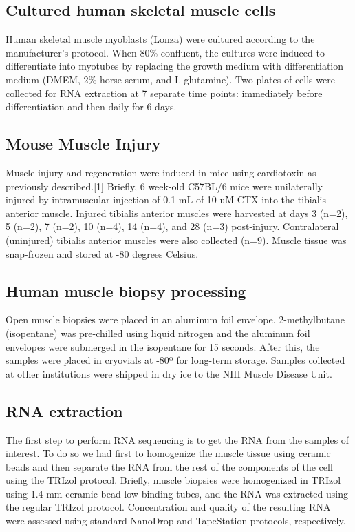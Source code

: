 \subsection{Cultured human skeletal muscle cells}
Human skeletal muscle myoblasts (Lonza) were cultured according to the manufacturer’s protocol. When 80\% confluent, the cultures were induced to differentiate into myotubes by replacing the growth medium with differentiation medium (DMEM, 2\% horse serum, and L-glutamine).  Two plates of cells were collected for RNA extraction at 7 separate time points: immediately before differentiation and then daily for 6 days.

\subsection{Mouse Muscle Injury}
Muscle injury and regeneration were induced in mice using cardiotoxin as previously described.[1] Briefly, 6 week-old C57BL/6 mice were unilaterally injured by intramuscular injection of 0.1 mL of 10 uM CTX into the tibialis anterior muscle. Injured tibialis anterior muscles were harvested at days 3 (n=2), 5 (n=2), 7 (n=2), 10 (n=4), 14 (n=4), and 28 (n=3) post-injury. Contralateral (uninjured) tibialis anterior muscles were also collected (n=9). Muscle tissue was snap-frozen and stored at -80 degrees Celsius.

\subsection{Human muscle biopsy processing}
Open muscle biopsies were placed in an aluminum foil envelope. 2-methylbutane (isopentane) was pre-chilled using liquid nitrogen and the aluminum foil envelopes were submerged in the isopentane for 15 seconds. After this, the samples were placed in cryovials at -80º for long-term storage. Samples collected at other institutions were shipped in dry ice to the NIH Muscle Disease Unit.

\subsection{RNA extraction}
The first step to perform RNA sequencing is to get the RNA from the samples of interest. To do so we had first to homogenize the muscle tissue using ceramic beads and then separate the RNA from the rest of the components of the cell using the TRIzol protocol. Briefly, muscle biopsies were homogenized in TRIzol using 1.4 mm ceramic bead low-binding tubes, and the RNA was extracted using the regular TRIzol protocol. Concentration and quality of the resulting RNA were assessed using standard NanoDrop and TapeStation protocols, respectively.

